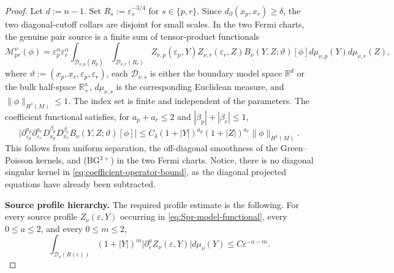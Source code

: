 \documentclass[11pt,reqno,a4paper]{amsart}
\numberwithin{equation}{section}
\theoremstyle{plain}
\theoremstyle{remark}
\theoremstyle{plain}
\begin{document}
\begin{proof}
Let $d:=n-1$.  Set $R_s:=\varepsilon_s^{-3/4}$ for $s\in\{p,r\}$.  Since $d_\partial(x_p,x_r)\ge\delta$,
the two diagonal-cutoff collars are disjoint for small scales.  In the two Fermi charts, the genuine pair
source is a finite sum of tensor-product functionals
\begin{equation}\label{eq:Spr-model-functional}
\mathcal M_{pr}^\nu(\phi)
=
\varepsilon_p^\alpha\varepsilon_r^\alpha
\int_{\mathcal D_{\nu,p}(R_p)}\int_{\mathcal D_{\nu,r}(R_r)}
Z_{\nu,p}(\varepsilon_p,Y)
Z_{\nu,r}(\varepsilon_r,Z)
B_\nu(Y,Z;\vartheta)[\phi]
d\mu_{\nu,p}(Y)d\mu_{\nu,r}(Z),
\end{equation}
where $\vartheta:=(x_p,x_r,\varepsilon_p,\varepsilon_r)$, each $\mathcal D_{\nu,s}$ is either the boundary
model space $\mathbb R^d$ or the bulk half-space $\mathbb R^n_+$, $d\mu_{\nu,s}$ is the corresponding Euclidean
measure, and $\|\phi\|_{H^1(M)}\le1$.  The index set is finite and independent of the parameters.  The
coefficient functional satisfies, for $a_p+a_r\le2$ and $|\beta_p|+|\beta_r|\le1$,
\begin{equation}\label{eq:coefficient-operator-bound}
\big|
\partial_{\varepsilon_p}^{a_p}\partial_{\varepsilon_r}^{a_r}
D_{x_p}^{\beta_p}D_{x_r}^{\beta_r}
B_\nu(Y,Z;\vartheta)[\phi]
\big|
\le
C_\delta(1+|Y|)^{a_p}(1+|Z|)^{a_r}\|\phi\|_{H^1(M)}.
\end{equation}
This follows from uniform separation, the off-diagonal smoothness of the Green--Poisson kernels, and
\textup{(BG$^{3+}$)} in the two Fermi charts. Notice, there is no diagonal singular kernel in \eqref{eq:coefficient-operator-bound}, as the diagonal projected equations have already been subtracted.

\smallskip\noindent
\textbf{Source profile hierarchy.}
The required profile estimate is the following.  For every source profile $Z_\nu(\varepsilon,Y)$ occurring in
\eqref{eq:Spr-model-functional}, every $0\le a\le2$, and every $0\le m\le2$,
\begin{equation}\label{eq:source-profile-hierarchy}
\int_{\mathcal D_\nu(R(\varepsilon))}
(1+|Y|)^m\big|\partial_\varepsilon^a Z_\nu(\varepsilon,Y)\big|d\mu_\nu(Y)
\le C\varepsilon^{-a-m}.
\end{equation}


\end{proof}
\end{document}
